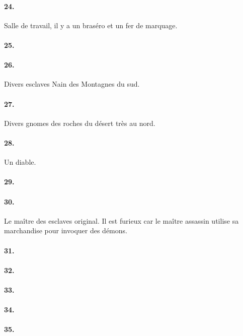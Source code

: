 \paragraph{24. }
Salle de travail, il y a un braséro et un fer de marquage. 

\paragraph{25. }
\paragraph{26. }
Divers esclaves Nain des Montagnes du sud.

\paragraph{27. }
Divers gnomes des roches du désert très au nord.

\paragraph{28. }
Un diable.

\paragraph{29. }
\paragraph{30. }
Le maître des esclaves original. Il est furieux car le maître assassin utilise 
sa marchandise pour invoquer des démons.

\paragraph{31. }
\paragraph{32. }
\paragraph{33. }
\paragraph{34. }
\paragraph{35. }

